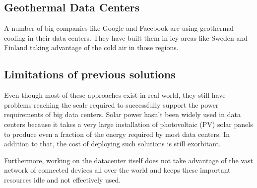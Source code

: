     \subsection{Geothermal Data Centers}
        A number of big companies like Google and Facebook are using geothermal cooling in their data centers.
        They have built them in icy areas like Sweden and Finland taking advantage of the cold air in those
        regions.

    \subsection{Limitations of previous solutions}
        Even though most of these approaches exist in real world, they still have problems reaching the scale
        required to successfully support the power requirements of big data centers.
        Solar power hasn’t been widely used in data centers because it takes a very large installation of
        photovoltaic (PV) solar panels to produce even a fraction of the energy required by most data centers.
        In addition to that, the cost of deploying such solutions is still exorbitant.

        Furthermore, working on the datacenter itself does not take advantage of the vast network of connected
        devices all over the world and keeps these important resources idle and not effectively used.


